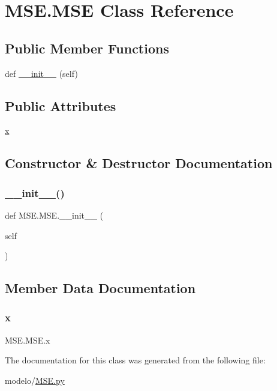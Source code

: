\hypertarget{class_m_s_e_1_1_m_s_e}{}\section{M\+S\+E.\+M\+SE Class Reference}
\label{class_m_s_e_1_1_m_s_e}
\subsection*{Public Member Functions}
\begin{DoxyCompactItemize}
\item 
def \mbox{\hyperlink{class_m_s_e_1_1_m_s_e_ac2559b4cd1350480bef5c2cbefd0afe6}{\+\_\+\+\_\+init\+\_\+\+\_\+}} (self)
\end{DoxyCompactItemize}
\subsection*{Public Attributes}
\begin{DoxyCompactItemize}
\item 
\mbox{\hyperlink{class_m_s_e_1_1_m_s_e_a3c8a7df08d33bbbdcce9204075542b25}{x}}
\end{DoxyCompactItemize}


\subsection{Constructor \& Destructor Documentation}
\mbox{\label{class_m_s_e_1_1_m_s_e_ac2559b4cd1350480bef5c2cbefd0afe6}} 
\subsubsection{\texorpdfstring{\+\_\+\+\_\+init\+\_\+\+\_\+()}{\_\_init\_\_()}}
{\footnotesize\ttfamily def M\+S\+E.\+M\+S\+E.\+\_\+\+\_\+init\+\_\+\+\_\+ (\begin{DoxyParamCaption}\item[{}]{self }\end{DoxyParamCaption})}



\subsection{Member Data Documentation}
\mbox{\label{class_m_s_e_1_1_m_s_e_a3c8a7df08d33bbbdcce9204075542b25}} 
\subsubsection{\texorpdfstring{x}{x}}
{\footnotesize\ttfamily M\+S\+E.\+M\+S\+E.\+x}



The documentation for this class was generated from the following file\+:\begin{DoxyCompactItemize}
\item 
modelo/\mbox{\hyperlink{_m_s_e_8py}{M\+S\+E.\+py}}\end{DoxyCompactItemize}
